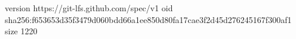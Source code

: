 version https://git-lfs.github.com/spec/v1
oid sha256:f653653d35f3479d060bdd66a1ee850d80fa17cae3f2d45d276245167f300af1
size 1220
